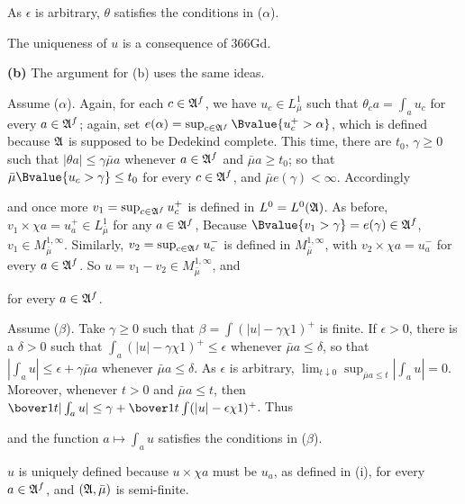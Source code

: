 {\noindent As $\epsilon$ is arbitrary, $\theta$ satisfies the conditions
in ($\alpha$).
     
\medskip
     
 The uniqueness of $u$ is a consequence of 366Gd.
     
\medskip
     
{\bf (b)} The argument for (b) uses the same ideas.
     
\medskip
     
 Assume ($\alpha$).   Again, for each $c\in\frak A^f$, we
have $u_c\in L^1_{\bar\mu}$ such that $\theta_ca=\int_au_c$ for every $a\in\frak A^f$;  again, set 
$e(\alpha)=\sup_{c\in\frak A^f}\Bvalue{u_c^+>\alpha}$,
which is defined because $\frak A$ is supposed to be Dedekind complete.
This time, there are $t_0$, $\gamma\ge 0$ such that 
$|\theta a|\le\gamma\bar\mu a$ whenever $a\in\frak A^f$ and 
$\bar\mu a\ge t_0$;
so that $\bar\mu\Bvalue{u_c>\gamma}\le t_0$ for every $c\in\frak A^f$,
and $\bar\mu e(\gamma)<\infty$.   Accordingly
     
     
\noindent and once more $v_1=\sup_{c\in\frak A^f}u_c^+$ is defined in
$L^0=L^0(\frak A)$.   As before,
$v_1\times\chi a=u_a^+\in L^1_{\bar\mu}$ for any $a\in\frak A^f$,
Because $\Bvalue{v_1>\gamma}=e(\gamma)\in\frak A^f$, 
$v_1\in M^{1,\infty}_{\bar\mu}$.   Similarly, 
$v_2=\sup_{c\in\frak A^f}u_c^-$ is defined
in $M^{1,\infty}_{\bar\mu}$, with $v_2\times\chi a=u_a^-$ for every $a\in\frak A^f$.   So $u=v_1-v_2\in M^{1,\infty}_{\bar\mu}$, and
     
     
\noindent for every $a\in\frak A^f$.
     
\medskip
     
 Assume ($\beta$).   Take $\gamma\ge 0$ such that
$\beta=\int(|u|-\gamma\chi 1)^+$ is finite.   If $\epsilon>0$, there is
a $\delta>0$ such that $\int_a(|u|-\gamma\chi 1)^+\le\epsilon$ whenever
$\bar\mu a\le\delta$, so that $|\int_au|\le\epsilon+\gamma\bar\mu a$
whenever $\bar\mu a\le\delta$.   As $\epsilon$ is arbitrary,
$\lim_{t\downarrow 0}\sup_{\bar\mu a\le t}|\int_au|=0$.   Moreover,
whenever $t>0$ and $\bar\mu a\le t$, then
$\bover1t|\int_au|\le\gamma+\bover1t\int(|u|-\epsilon\chi 1)^+$.   Thus
     
     
\noindent and the function $a\mapsto\int_au$ satisfies the conditions in
($\beta$).
     
\medskip
     
 $u$ is uniquely defined because $u\times\chi a$ must be
$u_a$, as defined in (i), for every $a\in\frak A^f$, and 
$(\frak A,\bar\mu)$ is semi-finite.
}%
     
